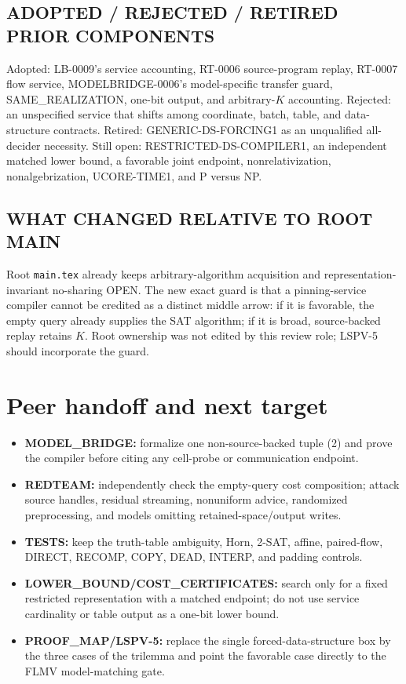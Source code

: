 \documentclass[11pt]{article}
\begin{document}
\subsection*{ADOPTED / REJECTED / RETIRED PRIOR COMPONENTS}
Adopted: LB-0009's service accounting, RT-0006 source-program replay,
RT-0007 flow service, MODELBRIDGE-0006's model-specific transfer guard,
SAME\_REALIZATION, one-bit output, and arbitrary-$K$ accounting.  Rejected:
an unspecified service that shifts among coordinate, batch, table, and
data-structure contracts.  Retired: GENERIC-DS-FORCING1 as an unqualified
all-decider necessity.  Still open: RESTRICTED-DS-COMPILER1, an independent
matched lower bound, a favorable joint endpoint, nonrelativization,
nonalgebrization, UCORE-TIME1, and P versus NP.

\subsection*{WHAT CHANGED RELATIVE TO ROOT MAIN}
Root \texttt{main.tex} already keeps arbitrary-algorithm acquisition and
representation-invariant no-sharing OPEN.  The new exact guard is that a
pinning-service compiler cannot be credited as a distinct middle arrow: if
it is favorable, the empty query already supplies the SAT algorithm; if it
is broad, source-backed replay retains $K$.  Root ownership was not edited by
this review role; LSPV-5 should incorporate the guard.

\section{Peer handoff and next target}

\begin{itemize}[leftmargin=*]
\item \textbf{MODEL\_BRIDGE:} formalize one non-source-backed tuple (2) and
prove the compiler before citing any cell-probe or communication endpoint.
\item \textbf{REDTEAM:} independently check the empty-query cost composition;
attack source handles, residual streaming, nonuniform advice, randomized
preprocessing, and models omitting retained-space/output writes.
\item \textbf{TESTS:} keep the truth-table ambiguity, Horn, 2-SAT, affine,
paired-flow, DIRECT, RECOMP, COPY, DEAD, INTERP, and padding controls.
\item \textbf{LOWER\_BOUND/COST\_CERTIFICATES:} search only for a fixed
restricted representation with a matched endpoint; do not use service
cardinality or table output as a one-bit lower bound.
\item \textbf{PROOF\_MAP/LSPV-5:} replace the single forced-data-structure
box by the three cases of the trilemma and point the favorable case directly
to the FLMV model-matching gate.
\end{itemize}
\end{document}
